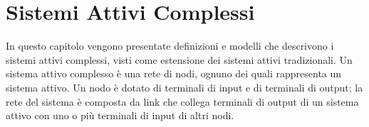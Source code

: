 \chapter{Sistemi Attivi Complessi}
In questo capitolo vengono presentate definizioni e modelli che descrivono i sistemi attivi complessi, visti come estensione dei sistemi attivi tradizionali. Un sistema attivo complesso è una rete di nodi, ognuno dei quali rappresenta un sistema attivo. Un nodo è dotato di terminali di input e di terminali di output; la rete del sistema è composta da link che collega terminali di output di un sistema attivo con uno o più terminali di input di altri nodi.